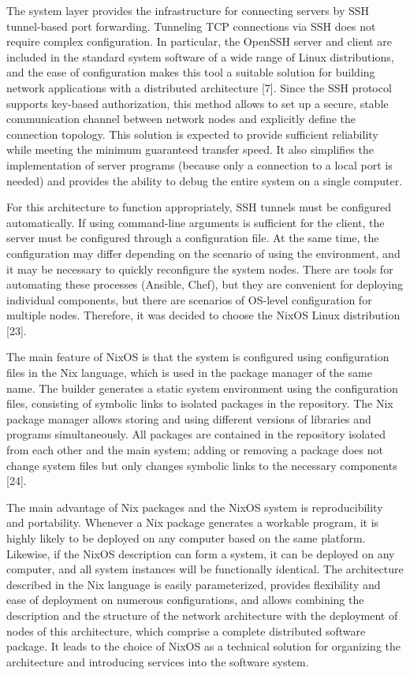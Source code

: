 \documentclass[
]{ceurart}
\begin{document}
The system layer provides the infrastructure for connecting servers by SSH tunnel-based port forwarding. Tunneling TCP connections via SSH does not require complex configuration. In particular, the OpenSSH server and client are included in the standard system software of a wide range of Linux distributions, and the ease of configuration makes this tool a suitable solution for building network applications with a distributed architecture [7]. Since the SSH protocol supports key-based authorization, this method allows to set up a secure, stable communication channel between network nodes and explicitly define the connection topology. This solution is expected to provide sufficient reliability while meeting the minimum guaranteed transfer speed. It also simplifies the implementation of server programs (because only a connection to a local port is needed) and provides the ability to debug the entire system on a single computer.

For this architecture to function appropriately, SSH tunnels must be configured automatically. If using command-line arguments is sufficient for the client, the server must be configured through a configuration file. At the same time, the configuration may differ depending on the scenario of using the environment, and it may be necessary to quickly reconfigure the system nodes. There are tools for automating these processes (Ansible, Chef), but they are convenient for deploying individual components, but there are scenarios of OS-level configuration for multiple nodes. Therefore, it was decided to choose the NixOS Linux distribution [23].

The main feature of NixOS is that the system is configured using configuration files in the Nix language, which is used in the package manager of the same name. The builder generates a static system environment using the configuration files, consisting of symbolic links to isolated packages in the repository. The Nix package manager allows storing and using different versions of libraries and programs simultaneously. All packages are contained in the repository isolated from each other and the main system; adding or removing a package does not change system files but only changes symbolic links to the necessary components [24].

The main advantage of Nix packages and the NixOS system is reproducibility and portability. Whenever a Nix package generates a workable program, it is highly likely to be deployed on any computer based on the same platform. Likewise, if the NixOS description can form a system, it can be deployed on any computer, and all system instances will be functionally identical. The architecture described in the Nix language is easily parameterized, provides flexibility and ease of deployment on numerous configurations, and allows combining the description and the structure of the network architecture with the deployment of nodes of this architecture, which comprise a complete distributed software package. It leads to the choice of NixOS as a technical solution for organizing the architecture and introducing services into the software system.
\end{document}
